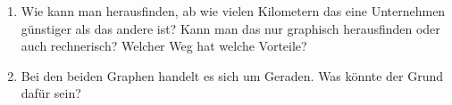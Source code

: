 \begin{LA}
\begin{enumerate}
\begin{center}
              \end{center}

              \begin{enumerate}
                  \item Wie können am Graphen die Grundgebühren
                        der beiden Taxi-Unternehmen abgelesen werden?

                  \item Wie können am Graphen die Kosten pro Kilometer
                        der beiden Taxi-Unternehmen abgelesen werden?
              \end{enumerate}

        \item Wie kann man herausfinden, ab wie vielen Kilometern
              das eine Unternehmen günstiger als das andere ist?
              Kann man das nur graphisch herausfinden oder auch
              rechnerisch? Welcher Weg hat welche Vorteile?

        \item Bei den beiden Graphen handelt es sich um Geraden.
              Was könnte der Grund dafür sein?

    \end{enumerate}
\end{LA}


